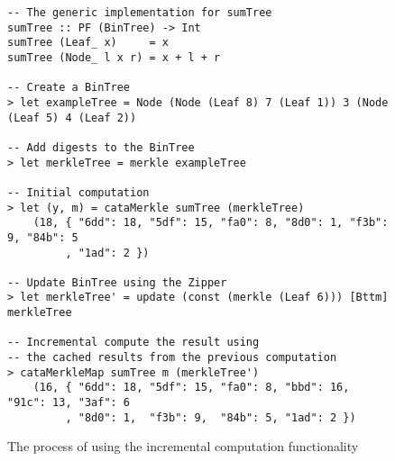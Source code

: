 \begin{figure}[H]
\captionsetup{justification=justified,singlelinecheck=false,margin=0cm}
\begin{verbatim}
-- The generic implementation for sumTree
sumTree :: PF (BinTree) -> Int
sumTree (Leaf_ x)     = x
sumTree (Node_ l x r) = x + l + r

-- Create a BinTree
> let exampleTree = Node (Node (Leaf 8) 7 (Leaf 1)) 3 (Node (Leaf 5) 4 (Leaf 2))

-- Add digests to the BinTree
> let merkleTree = merkle exampleTree

-- Initial computation
> let (y, m) = cataMerkle sumTree (merkleTree)
    (18, { "6dd": 18, "5df": 15, "fa0": 8, "8d0": 1, "f3b": 9, "84b": 5
         , "1ad": 2 })

-- Update BinTree using the Zipper
> let merkleTree' = update (const (merkle (Leaf 6))) [Bttm] merkleTree

-- Incremental compute the result using
-- the cached results from the previous computation
> cataMerkleMap sumTree m (merkleTree')
    (16, { "6dd": 18, "5df": 15, "fa0": 8, "bbd": 16, "91c": 13, "3af": 6
         , "8d0": 1,  "f3b": 9,  "84b": 5, "1ad": 2 })         
\end{verbatim}
\caption{The process of using the incremental computation functionality}
\label{<label>}
\end{figure}